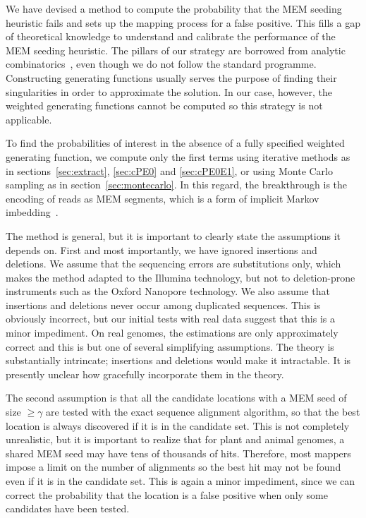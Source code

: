 \documentclass{article}
\begin{document}
We have devised a method to compute the probability that the MEM seeding
heuristic fails and sets up the mapping process for a false positive. This
fills a gap of theoretical knowledge to understand and calibrate the
performance of the MEM seeding heuristic. The pillars of our strategy are
borrowed from analytic combinatorics~\cite{flajolet2009analytic,
sedgewick2013introduction}, even though we do not follow the standard
programme. Constructing generating functions usually serves the purpose of
finding their singularities in order to approximate the solution. In our
case, however, the weighted generating functions cannot be computed so
this strategy is not applicable.

To find the probabilities of interest in the absence of a fully specified
weighted generating function, we compute only the first terms using
iterative methods as in sections~\ref{sec:extract}, \ref{sec:cPE0} and
\ref{sec:cPE0E1}, or using Monte Carlo sampling as in
section~\ref{sec:montecarlo}. In this regard, the breakthrough is the
encoding of reads as MEM segments, which is a form of implicit Markov
imbedding~\cite{fu1994distribution}.

The method is general, but it is important to clearly state the
assumptions it depends on. First and most importantly, we have ignored
insertions and deletions. We assume that the sequencing errors are
substitutions only, which makes the method adapted to the Illumina
technology, but not to deletion-prone instruments such as the Oxford
Nanopore technology. We also assume that insertions and deletions never
occur among duplicated sequences. This is obviously incorrect, but our
initial tests with real data suggest that this is a minor impediment. On
real genomes, the estimations are only approximately correct and this is
but one of several simplifying assumptions. The theory is substantially
intrincate; insertions and deletions would make it intractable.
It is presently unclear how gracefully incorporate them in the theory.

The second assumption is that all the candidate locations with a MEM
seed of size $\geq \gamma$ are tested with the exact sequence alignment
algorithm, so that the best location is always discovered if it is in the
candidate set. This is not completely unrealistic, but it is important to
realize that for plant and animal genomes, a shared MEM seed may have tens
of thousands of hits. Therefore, most mappers impose a limit on the number
of alignments so the best hit may not be found even if it is in the
candidate set. This is again a minor impediment, since we can correct the
probability that the location is a false positive when only some
candidates have been tested.
\end{document}
